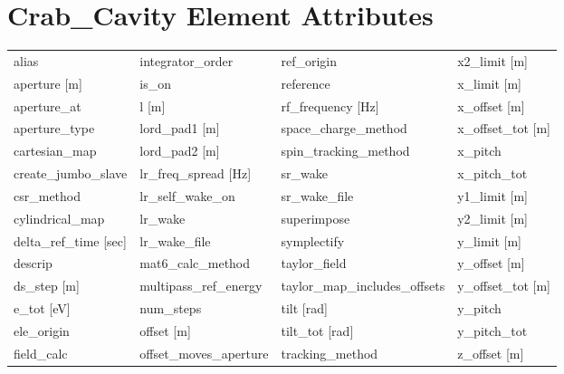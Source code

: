  \section{Crab_Cavity Element Attributes}
 \label{s:list.crab.cavity}
 
 \begin{tabular}{llll} \toprule
alias                          & integrator_order               & ref_origin                     & x2_limit [m]                   \\
aperture [m]                   & is_on                          & reference                      & x_limit [m]                    \\
aperture_at                    & l [m]                          & rf_frequency [Hz]              & x_offset [m]                   \\
aperture_type                  & lord_pad1 [m]                  & space_charge_method            & x_offset_tot [m]               \\
cartesian_map                  & lord_pad2 [m]                  & spin_tracking_method           & x_pitch                        \\
create_jumbo_slave             & lr_freq_spread [Hz]            & sr_wake                        & x_pitch_tot                    \\
csr_method                     & lr_self_wake_on                & sr_wake_file                   & y1_limit [m]                   \\
cylindrical_map                & lr_wake                        & superimpose                    & y2_limit [m]                   \\
delta_ref_time [sec]           & lr_wake_file                   & symplectify                    & y_limit [m]                    \\
descrip                        & mat6_calc_method               & taylor_field                   & y_offset [m]                   \\
ds_step [m]                    & multipass_ref_energy           & taylor_map_includes_offsets    & y_offset_tot [m]               \\
e_tot [eV]                     & num_steps                      & tilt [rad]                     & y_pitch                        \\
ele_origin                     & offset [m]                     & tilt_tot [rad]                 & y_pitch_tot                    \\
field_calc                     & offset_moves_aperture          & tracking_method                & z_offset [m]                   \\

\end{tabular}
